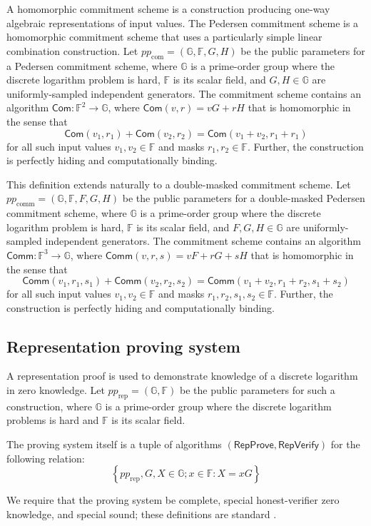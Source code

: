 \documentclass{llncs}
\newcommand{\G}{\mathbb{G}}
\newcommand{\F}{\mathbb{F}}
\newcommand{\func}[1]{\mathsf{#1}}
\newcommand{\com}{\func{Com}}
\newcommand{\comm}{\func{Comm}}
\begin{document}
A homomorphic commitment scheme is a construction producing one-way algebraic representations of input values.
The Pedersen commitment scheme is a homomorphic commitment scheme that uses a particularly simple linear combination construction.
Let $pp_{\text{com}} = (\G, \F, G, H)$ be the public parameters for a Pedersen commitment scheme, where $\G$ is a prime-order group where the discrete logarithm problem is hard, $\F$ is its scalar field, and $G,H \in \G$ are uniformly-sampled independent generators.
The commitment scheme contains an algorithm $\com: \F^2 \to \G$, where $\com(v,r) = vG + rH$ that is homomorphic in the sense that $$\com(v_1,r_1) + \com(v_2,r_2) = \com(v_1 + v_2,r_1 + r_1)$$ for all such input values $v_1,v_2 \in \F$ and masks $r_1,r_2 \in \F$.
Further, the construction is perfectly hiding and computationally binding.

This definition extends naturally to a double-masked commitment scheme.
Let $pp_{\text{comm}} = (\G, \F, F, G, H)$ be the public parameters for a double-masked Pedersen commitment scheme, where $\G$ is a prime-order group where the discrete logarithm problem is hard, $\F$ is its scalar field, and $F,G,H \in \G$ are uniformly-sampled independent generators.
The commitment scheme contains an algorithm $\comm: \F^3 \to \G$, where $\comm(v,r,s) = vF + rG + sH$ that is homomorphic in the sense that $$\comm(v_1,r_1,s_1) + \comm(v_2,r_2,s_2) = \comm(v_1 + v_2,r_1 + r_2,s_1 + s_2)$$ for all such input values $v_1,v_2 \in \F$ and masks $r_1,r_2,s_1,s_2 \in \F$.
Further, the construction is perfectly hiding and computationally binding.


\subsection{Representation proving system}

A representation proof is used to demonstrate knowledge of a discrete logarithm in zero knowledge.
Let $pp_{\text{rep}} = (\G, \F)$ be the public parameters for such a construction, where $\G$ is a prime-order group where the discrete logarithm problems is hard and $\F$ is its scalar field.

The proving system itself is a tuple of algorithms $(\func{RepProve},\func{RepVerify})$ for the following relation:
$$\left\{ pp_{\text{rep}}, G, X \in \G ; x \in \F : X = xG \right\}$$

We require that the proving system be complete, special honest-verifier zero knowledge, and special sound; these definitions are standard \cite{groth}.
\end{document}
